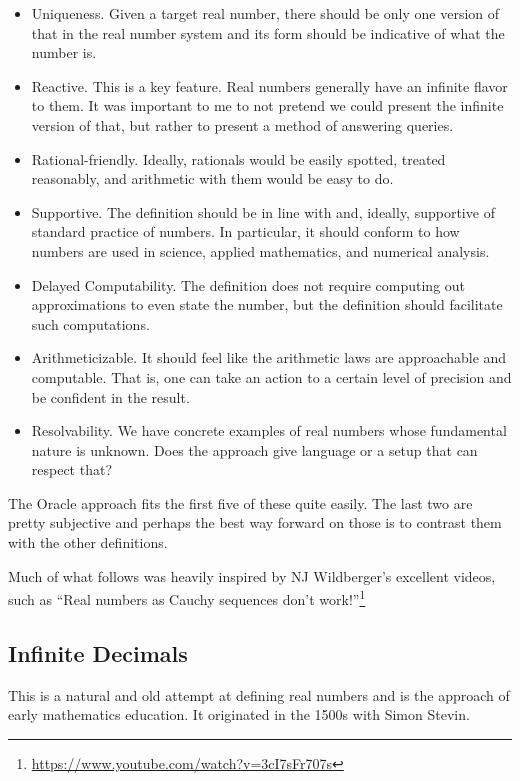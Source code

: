 \documentclass[12pt]{article}
\theoremstyle{remark}
\begin{document}
\begin{itemize}
    \item Uniqueness. Given a target real number, there should be only one version of that in the real number system and its form should be indicative of what the number is. 
    \item Reactive. This is a key feature. Real numbers generally have an infinite flavor to them. It was important to me to not pretend we could present the infinite version of that, but rather to present a method of answering queries. 
    \item Rational-friendly. Ideally, rationals would be easily spotted, treated reasonably, and arithmetic with them would be easy to do. 
    \item Supportive. The definition should be in line with and, ideally, supportive of standard practice of numbers. In particular, it should conform to how numbers are used in science, applied mathematics, and numerical analysis. 
    \item Delayed Computability. The definition does not require computing out approximations to even state the number, but the definition should facilitate such computations. 
    \item Arithmeticizable. It should feel like the arithmetic laws are approachable and computable. That is, one can take an action to a certain level of precision and be confident in the result.
    \item Resolvability. We have concrete examples of real numbers whose fundamental nature is unknown. Does the approach give language or a setup that can respect that? 
\end{itemize}

The Oracle approach fits the first five of these quite easily. The last two are pretty subjective and perhaps the best way forward on those is to contrast them with the other definitions. 

Much of what follows was heavily inspired by NJ Wildberger's excellent videos, such as ``Real numbers as Cauchy sequences don't work!''\footnote{\url{https://www.youtube.com/watch?v=3cI7sFr707s}}


\subsection{Infinite Decimals}

This is a natural and old attempt at defining real numbers and is the approach of early mathematics education. It originated in the 1500s with Simon Stevin. 
\end{document}
